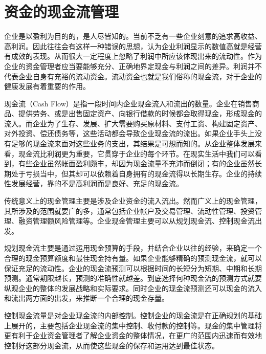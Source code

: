 \section {资金的现金流管理}

    企业是以盈利为目的的，是人尽皆知的。当前不乏有一些企业刻意的追求高收益、高利润。因此往往会有这样一种错误的思想，认为企业利润显示的数值高就是经营有成效的表现。从而很大一定程度上忽略了利润中所应该体现出来的流动性。作为企业的资金管理者应当要能够充分、正确地界定现金与利润之间的差异。利润并不代表企业自身有充裕的流动资金。流动资金也就是我们俗称的现金流，对于企业的健康发展有着重要的作用。

    现金流（Cash Flow）是指一段时间内企业现金流入和流出的数量。企业在销售商品、提供劳务、或是出售固定资产、向银行借款的时候都会取得现金，形成现金的流入。而企业为了生存、发展、扩大需要购买原材料、支付工资、构建固定资产、对外投资、偿还债务等，这些活动都会导致企业现金流的流出。如果企业手头上没有足够的现金流来面对这些业务的支出，其结果是可想而知的。从企业整体发展来看，现金流比利润更为重要，它贯穿于企业的每个环节。在现实生活中我们可以看到，有些企业虽然帐面盈利颇丰，却因为现金流量不充沛而倒闭；有的企业虽然长期处于亏损当中，但其却可以依赖着自身拥有的现金流得以长期生存。企业的持续性发展经营，靠的不是高利润而是良好、充足的现金流。

    传统意义上的现金管理主要是涉及企业资金的流入流出。然而广义上的现金管理，其所涉及的范围就要广的多，通常包括企业帐户及交易管理、流动性管理、投资管理、融资管理额风险管理等。企业现金管理主要可以从规划现金流、控制现金流出发。

    规划现金流主要是通过运用现金预算的手段，并结合企业以往的经验，来确定一个合理的现金预算额度和最佳现金持有量。如果企业能够精确的预测现金流，就可以保证充足的流动性。企业的现金流预测可以根据时间的长短分为短期、中期和长期预测。通常期限越长，预测的准确性就越差。到底选择何种现金流的预测方式就要纵观企业的整体的发展战略和实际要求。同时企业的现金流预测还可以现金的流入和流出两方面的出发，来推断一个合理的现金存量。

    控制现金流量是对企业现金流的内部控制。控制企业的现金流是在正确规划的基础上展开的，主要包括企业现金流的集中控制、收付款的控制等。现金的集中管理将更有利于企业资金管理者了解企业资金的整体情况，在更广的范围内迅速而有效地控制好这部分现金流，从而使这些现金的保存和运用达到最佳状态。
